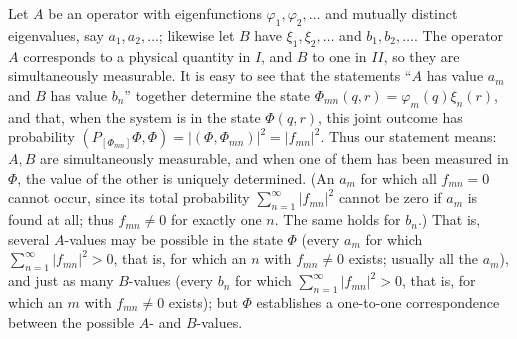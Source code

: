 \documentclass[fontsize=13pt,twoside,openany,headings=normal,parskip=false,bookmarkpackage=false,DIV=calc]{scrbook}
\begin{document}
Let $A$ be an operator with eigenfunctions $\varphi_1,\varphi_2,\ldots$ and mutually distinct eigenvalues, say $a_1,a_2,\ldots$; likewise let $B$ have $\xi_1,\xi_2,\ldots$ and $b_1,b_2,\ldots$. The operator $A$ corresponds to a physical quantity in $I$, and $B$ to one in $II$, so they are simultaneously measurable. It is easy to see that the statements ``$A$ has value $a_m$ and $B$ has value $b_n$'' together determine the state $\Phi_{mn}(q,r)=\varphi_m(q)\xi_n(r)$, and that, when the system is in the state $\Phi(q,r)$, this joint outcome has probability $(P_{[\Phi_{mn}]}\Phi,\Phi)=|(\Phi,\Phi_{mn})|^2=|f_{mn}|^2$.
Thus our statement means: $A,B$ are simultaneously measurable, and when one of them has been measured in $\Phi$, the value of the other is uniquely determined. (An $a_m$ for which all $f_{mn}=0$ cannot occur, since its total probability $\sum_{n=1}^{\infty}|f_{mn}|^2$ cannot be zero if $a_m$ is found at all; thus $f_{mn}\ne0$ for exactly one $n$. The same holds for $b_n$.) That is, several $A$-values may be possible in the state $\Phi$ (every $a_m$ for which $\sum_{n=1}^{\infty}|f_{mn}|^2>0$, that is, for which an $n$ with $f_{mn}\ne0$ exists; usually all the $a_m$), and just as many $B$-values (every $b_n$ for which $\sum_{n=1}^{\infty}|f_{mn}|^2>0$, that is, for which an $m$ with $f_{mn}\ne0$ exists); but $\Phi$ establishes a one-to-one correspondence between the possible $A$- and $B$-values.
\hypertarget{origpage-232}{}%
\end{document}
